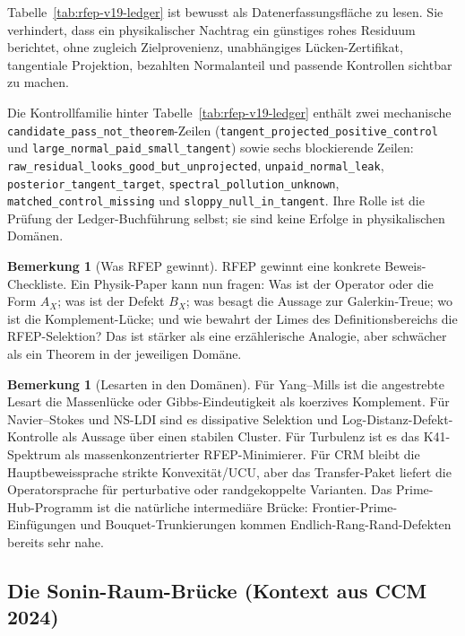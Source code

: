 \documentclass[11pt,a4paper]{article}
\theoremstyle{plain}
\theoremstyle{definition}
\newtheorem{remark}[theorem]{Bemerkung}
\begin{document}
Tabelle~\ref{tab:rfep-v19-ledger} ist bewusst als Datenerfassungsfläche
zu lesen. Sie verhindert, dass ein physikalischer Nachtrag ein günstiges
rohes Residuum berichtet, ohne zugleich Zielprovenienz, unabhängiges
Lücken-Zertifikat, tangentiale Projektion, bezahlten Normalanteil und
passende Kontrollen sichtbar zu machen.

Die Kontrollfamilie hinter Tabelle~\ref{tab:rfep-v19-ledger} enthält zwei
mechanische \texttt{candidate\_pass\_not\_theorem}-Zeilen
(\texttt{tangent\_projected\_positive\_control} und
\texttt{large\_normal\_paid\_small\_tangent}) sowie sechs blockierende
Zeilen: \texttt{raw\_residual\_looks\_good\_but\_unprojected},
\texttt{unpaid\_normal\_leak}, \texttt{posterior\_tangent\_target},
\texttt{spectral\_pollution\_unknown},
\texttt{matched\_control\_missing} und
\texttt{sloppy\_null\_in\_tangent}. Ihre Rolle ist die Prüfung der
Ledger-Buchführung selbst; sie sind keine Erfolge in physikalischen Domänen.

\begin{remark}[Was RFEP gewinnt]
\label{rem:rfep-gain}
RFEP gewinnt eine konkrete Beweis-Checkliste. Ein Physik-Paper kann nun fragen:
Was ist der Operator oder die Form $A_X$; was ist der Defekt $B_X$; was
besagt die Aussage zur Galerkin-Treue; wo ist die Komplement-Lücke;
und wie bewahrt der Limes des Definitionsbereichs die RFEP-Selektion? Das ist
stärker als eine erzählerische Analogie, aber schwächer als ein Theorem in der jeweiligen Domäne.
\end{remark}

\begin{remark}[Lesarten in den Domänen]
\label{rem:domain-readings}
Für Yang--Mills ist die angestrebte Lesart die Massenlücke oder Gibbs-Eindeutigkeit
als koerzives Komplement. Für Navier--Stokes und NS-LDI sind es dissipative Selektion
und Log-Distanz-Defekt-Kontrolle als Aussage über einen stabilen Cluster. Für Turbulenz
ist es das K41-Spektrum als massenkonzentrierter RFEP-Minimierer. Für CRM bleibt
die Hauptbeweissprache strikte Konvexität/UCU, aber das Transfer-Paket liefert die
Operatorsprache für perturbative oder randgekoppelte Varianten. Das Prime-Hub-Programm
\cite{PrimeHubSynthesis} ist die natürliche intermediäre Brücke: Frontier-Prime-Einfügungen
und Bouquet-Trunkierungen kommen Endlich-Rang-Rand-Defekten bereits sehr nahe.
\end{remark}

\subsection{Die Sonin-Raum-Brücke (Kontext aus CCM 2024)}
\label{sec:sonin}
\end{document}
